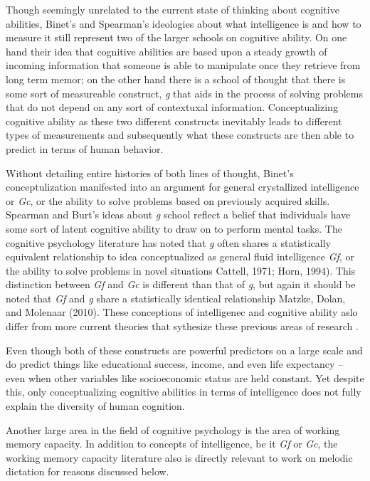 \documentclass[]{book}
\begin{document}
Though seemingly unrelated to the current state of thinking about cognitive abilities, Binet's and Spearman's ideologies about what intelligence is and how to measure it still represent two of the larger schools on cognitive ability.
On one hand their idea that cognitive abilities are based upon a steady growth of incoming information that someone is able to manipulate once they retrieve from long term memor; on the other hand there is a school of thought that there is some sort of measureable construct, \emph{g} that aids in the process of solving problems that do not depend on any sort of contextuxal information.
Conceptualizing cognitive ability as these two different constructs inevitably leads to different types of measurements and subsequently what these constructs are then able to predict in terms of human behavior.

Without detailing entire histories of both lines of thought, Binet's conceptulization manifested into an argument for general crystallized intelligence or \emph{Gc}, or the ability to solve problems based on previously acquired skills.
Spearman and Burt's ideas about \emph{g} school reflect a belief that individuals have some sort of latent cognitive ability to draw on to perform mental tasks.
The cognitive psychology literature has noted that \emph{g} often shares a statistically equivalent relationship to idea conceptualized as general fluid intelligence \emph{Gf}, or the ability to solve problems in novel situations Cattell, 1971; Horn, 1994).
This distinction between \emph{Gf} and \emph{Gc} is different than that of \emph{g}, but again it should be noted that \emph{Gf} and \emph{g} share a statistically identical relationship Matzke, Dolan, and Molenaar (2010).
These conceptions of intelligenec and cognitive ability aslo differ from more current theories that sythesize these previous areas of research \citep{kovacsProcessOverlapTheory2016}.

Even though both of these constructs are powerful predictors on a large scale and do predict things like educational success, income, and even life expectancy \citep{ritchieIntelligenceAllThat2015}-- even when other variables like socioeconomic status are held constant.
Yet despite this, only conceptualizing cognitive abilities in terms of intelligence does not fully explain the diversity of human cognition.

Another large area in the field of cognitive psychology is the area of working memory capacity.
In addition to concepts of intelligence, be it \emph{Gf} or \emph{Gc}, the working memory capacity literature also is directly relevant to work on melodic dictation for reasons discussed below.
\end{document}

